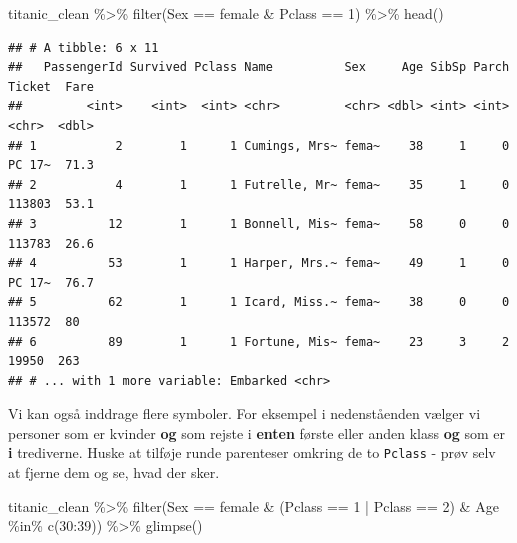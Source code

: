 \documentclass[
]{book}
\newenvironment{Shaded}{\begin{snugshade}}{\end{snugshade}}
\newcommand{\DecValTok}[1]{\textcolor[rgb]{0.00,0.00,0.81}{#1}}
\newcommand{\FunctionTok}[1]{\textcolor[rgb]{0.00,0.00,0.00}{#1}}
\newcommand{\NormalTok}[1]{#1}
\newcommand{\SpecialCharTok}[1]{\textcolor[rgb]{0.00,0.00,0.00}{#1}}
\newcommand{\StringTok}[1]{\textcolor[rgb]{0.31,0.60,0.02}{#1}}
\begin{document}
\begin{Shaded}
\begin{Highlighting}[]
\NormalTok{titanic\_clean }\SpecialCharTok{\%\textgreater{}\%} 
    \FunctionTok{filter}\NormalTok{(Sex }\SpecialCharTok{==} \StringTok{\textquotesingle{}female\textquotesingle{}} \SpecialCharTok{\&}\NormalTok{ Pclass }\SpecialCharTok{==} \DecValTok{1}\NormalTok{) }\SpecialCharTok{\%\textgreater{}\%}
    \FunctionTok{head}\NormalTok{()}
\end{Highlighting}
\end{Shaded}

\begin{verbatim}
## # A tibble: 6 x 11
##   PassengerId Survived Pclass Name          Sex     Age SibSp Parch Ticket  Fare
##         <int>    <int>  <int> <chr>         <chr> <dbl> <int> <int> <chr>  <dbl>
## 1           2        1      1 Cumings, Mrs~ fema~    38     1     0 PC 17~  71.3
## 2           4        1      1 Futrelle, Mr~ fema~    35     1     0 113803  53.1
## 3          12        1      1 Bonnell, Mis~ fema~    58     0     0 113783  26.6
## 4          53        1      1 Harper, Mrs.~ fema~    49     1     0 PC 17~  76.7
## 5          62        1      1 Icard, Miss.~ fema~    38     0     0 113572  80  
## 6          89        1      1 Fortune, Mis~ fema~    23     3     2 19950  263  
## # ... with 1 more variable: Embarked <chr>
\end{verbatim}

Vi kan også inddrage flere symboler. For eksempel i nedenståenden vælger vi personer som er kvinder \textbf{og} som rejste i \textbf{enten} første eller anden klass \textbf{og} som er \textbf{i} trediverne. Huske at tilføje runde parenteser omkring de to \texttt{Pclass} - prøv selv at fjerne dem og se, hvad der sker.

\begin{Shaded}
\begin{Highlighting}[]
\NormalTok{titanic\_clean }\SpecialCharTok{\%\textgreater{}\%} 
    \FunctionTok{filter}\NormalTok{(Sex }\SpecialCharTok{==} \StringTok{\textquotesingle{}female\textquotesingle{}} \SpecialCharTok{\&}\NormalTok{ (Pclass }\SpecialCharTok{==} \DecValTok{1} \SpecialCharTok{|}\NormalTok{ Pclass }\SpecialCharTok{==} \DecValTok{2}\NormalTok{) }\SpecialCharTok{\&}\NormalTok{ Age }\SpecialCharTok{\%in\%} \FunctionTok{c}\NormalTok{(}\DecValTok{30}\SpecialCharTok{:}\DecValTok{39}\NormalTok{)) }\SpecialCharTok{\%\textgreater{}\%}
    \FunctionTok{glimpse}\NormalTok{()}
\end{Highlighting}
\end{Shaded}
\end{document}
